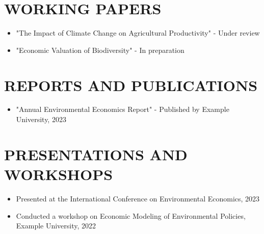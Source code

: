 \documentclass[9pt,margin]{res}
\begin{document}
\begin{resume}
\section{WORKING PAPERS}
    \vspace{1em}
    \begin{itemize}[label={--}]
        \item "The Impact of Climate Change on Agricultural Productivity" - Under review
        \item "Economic Valuation of Biodiversity" - In preparation
    \end{itemize}

    \noindent\hrulefill %

\section{REPORTS AND PUBLICATIONS}
    \vspace{1em}
    \begin{itemize}[label={--}]
        \item "Annual Environmental Economics Report" - Published by Example University, 2023
    \end{itemize}

    \noindent\hrulefill %

\section{PRESENTATIONS AND WORKSHOPS}
    \vspace{1em}
    \begin{itemize}[label={--}]
        \item Presented at the International Conference on Environmental Economics, 2023
        \item Conducted a workshop on Economic Modeling of Environmental Policies, Example University, 2022
    \end{itemize}


\end{resume}
\end{document}

